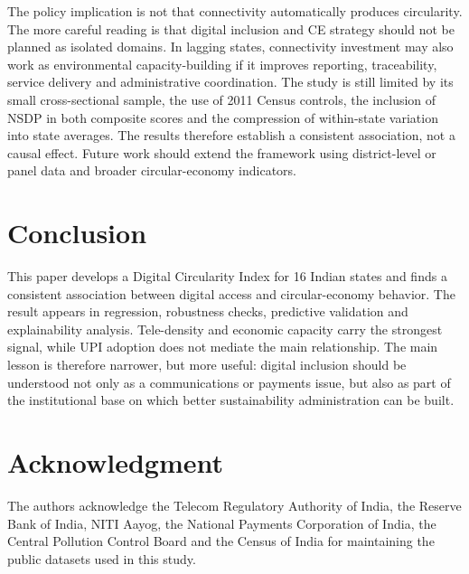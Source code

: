 \documentclass[10pt,a4paper]{article}
\begin{document}
The policy implication is not that connectivity automatically produces circularity. The more careful reading is that digital inclusion and CE strategy should not be planned as isolated domains. In lagging states, connectivity investment may also work as environmental capacity-building if it improves reporting, traceability, service delivery and administrative coordination. The study is still limited by its small cross-sectional sample, the use of 2011 Census controls, the inclusion of NSDP in both composite scores and the compression of within-state variation into state averages. The results therefore establish a consistent association, not a causal effect. Future work should extend the framework using district-level or panel data and broader circular-economy indicators.

\section{Conclusion}

This paper develops a Digital Circularity Index for 16 Indian states and finds a consistent association between digital access and circular-economy behavior. The result appears in regression, robustness checks, predictive validation and explainability analysis. Tele-density and economic capacity carry the strongest signal, while UPI adoption does not mediate the main relationship. The main lesson is therefore narrower, but more useful: digital inclusion should be understood not only as a communications or payments issue, but also as part of the institutional base on which better sustainability administration can be built.

\section*{Acknowledgment}

The authors acknowledge the Telecom Regulatory Authority of India, the Reserve Bank of India, NITI Aayog, the National Payments Corporation of India, the Central Pollution Control Board and the Census of India for maintaining the public datasets used in this study.
\end{document}
